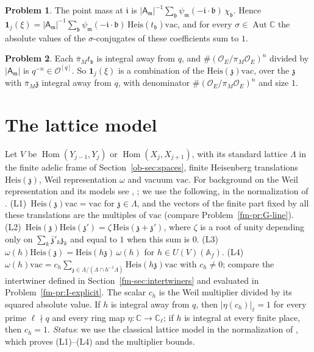 \documentclass[reqno]{amsart}
\theoremstyle{definition}
\newtheorem{problem}{Problem}[section]
\theoremstyle{plain}
\newcommand{\C}{\mathbb{C}}
\newcommand{\Oc}{\mathcal{O}}
\newcommand{\Hom}{\operatorname{Hom}}
\newcommand{\Aut}{\operatorname{Aut}}
\newcommand{\Heis}{\mathrm{Heis}}
\newcommand{\vac}{\mathrm{vac}}
\newcommand{\z}{{\mathfrak{z}}}
\begin{document}
\begin{problem}\label{pr:delta}
The point mass at \(\mathfrak i\) is \(\lvert \mathsf A_{\mathfrak m}\rvert^{-1}\sum_{\mathfrak b}\psi_{\mathfrak m}(-\mathfrak i\cdot\mathfrak b)\,\chi_{\mathfrak b}\).  Hence \(\mathbf 1_j(\xi)=\lvert \mathsf A_{\mathfrak m}\rvert^{-1}\sum_{\mathfrak b}\psi_{\mathfrak m}(-\mathfrak i\cdot\mathfrak b)\,\Heis(t_{\mathfrak b})\vac\), and for every \(\sigma\in\Aut\C\) the absolute values of the \(\sigma\)-conjugates of these coefficients sum to \(1\).
\end{problem}

\begin{problem}\label{pr:delta-den}
Each \(\bar\pi_Mt_{\mathfrak b}\) is integral away from \(q\), and \(\#(\Oc_E/\pi_M\Oc_E)^n\) divided by \(\lvert \mathsf A_{\mathfrak m}\rvert\) is \(q^{-n}\in\Oc^{[q]}\).  So \(\mathbf 1_j(\xi)\) is a combination of the \(\Heis(\z)\vac\), over the \(\z\) with \(\bar\pi_M\z\) integral away from \(q\), with denominator \(\#(\Oc_E/\pi_M\Oc_E)^n\) and size \(1\).
\end{problem}

\section{The lattice model}\label{sec:lattice}

Let \(V\) be \(\Hom(Y_{j-1},Y_j)\) or \(\Hom(X_j,X_{j+1})\), with its standard lattice \(\Lambda\) in the finite adelic frame of Section~\ref{ob-sec:spaces}, finite Heisenberg translations \(\Heis(\z)\), Weil representation \(\omega\) and vacuum \(\vac\).  For background on the Weil representation and its models see \cite{We}, \cite[Ch.~2]{MVW}; we use the following, in the normalization of \cite{GL}.  (L1)~\(\Heis(\z)\vac=\vac\) for \(\z\in\Lambda\), and the vectors of the finite part fixed by all these translations are the multiples of \(\vac\) (compare Problem~\ref{fm-pr:G-line}).  (L2)~\(\Heis(\z)\Heis(\z')=\zeta\,\Heis(\z+\z')\), where \(\zeta\) is a root of unity depending only on \(\sum_k\bar\z'_k\z_k\) and equal to \(1\) when this sum is \(0\).  (L3)~\(\omega(h)\Heis(\z)=\Heis(h\z)\,\omega(h)\) for \(h\in U(V)(\mathbb A_f)\).  (L4)~\(\omega(h)\vac=c_h\sum_{\z\in\Lambda/(\Lambda\cap h^{-1}\Lambda)}\Heis(h\z)\vac\) with \(c_h\ne0\); compare the intertwiner defined in Section~\ref{fm-sec:intertwiners} and evaluated in Problem~\ref{fm-pr:I-explicit}.  The scalar \(c_h\) is the Weil multiplier divided by its squared absolute value.  If \(h\) is integral away from \(q\), then \(\lvert\eta(c_h)\rvert_\ell=1\) for every prime \(\ell\nmid q\) and every ring map \(\eta\colon\C\to\C_\ell\); if \(h\) is integral at every finite place, then \(c_h=1\).  \emph{Status}: we use the classical lattice model in the normalization of \cite{GL}, which proves (L1)--(L4) and the multiplier bounds.
\end{document}
